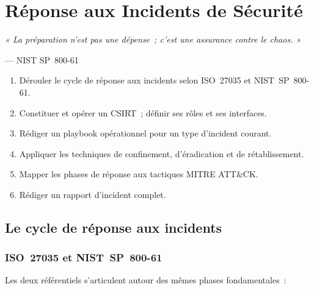 \chapter{Réponse aux Incidents de Sécurité}
\label{chap:ir}

\epigraph{\itshape « La préparation n'est pas une dépense~;
  c'est une assurance contre le chaos. »}
         {--- NIST SP~800-61}

\begin{boxobjectifs}
\begin{enumerate}
  \item Dérouler le cycle de réponse aux incidents selon ISO~27035 et NIST~SP~800-61.
  \item Constituer et opérer un CSIRT~; définir ses rôles et ses interfaces.
  \item Rédiger un playbook opérationnel pour un type d'incident courant.
  \item Appliquer les techniques de confinement, d'éradication et de
        rétablissement.
  \item Mapper les phases de réponse aux tactiques MITRE ATT\&CK.
  \item Rédiger un rapport d'incident complet.
\end{enumerate}
\end{boxobjectifs}

\section{Le cycle de réponse aux incidents}
\label{sec:ir-cycle}

\subsection{ISO~27035 et NIST~SP~800-61}

Les deux référentiels s'articulent autour des mêmes phases fondamentales~:

